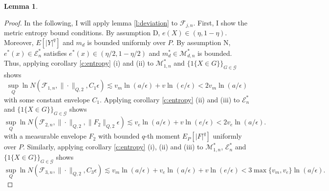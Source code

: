 \documentclass[12pt,oneside,reqno,english]{amsart}
\theoremstyle{definition}
\newtheorem{lemma}{Lemma}
\begin{document}
\begin{lemma}
\begin{proof}
In the following, I will apply lemma \ref{l:deviation} to $\mathcal{F}_{j,n}$. 
First, I show the metric entropy bound conditions. 
By assumption D, $e(X)\in (\eta,1-\eta)$. Moreover, $E[|Y|^{q}]$ and $m_{d}$ is bounded uniformly over $P$. 
By assumption N,  $e^{*}(x)\in \mathcal{E}^{*}_{n}$ satisfies $e^{*}(x)\in (\eta/2,1-\eta/2)$ and $m^{*}_{d}\in \mathcal{M}^{*}_{d,n}$ is bounded.
Thus, applying corollary \ref{c:entropy} (i) and (ii) to $\mathcal{M}^{*}_{1,n}$ and $\{1\{X\in G\}\}_{G\in \mathcal{G}}$ shows 
\[\sup_{Q}\ln N(\mathcal{F}_{1,n},\|\cdot\|_{Q,2},C_{1}\epsilon)\lesssim  v_{m}\ln(a/\epsilon)+v\ln(e/\epsilon)< 2v_{m}\ln(a/\epsilon)\]
with some constant envelope $C_{1}$. Applying corollary \ref{c:entropy} (ii) and (iii) to $\mathcal{E}^{*}_{n}$ and $\{1\{X\in G\}\}_{G\in \mathcal{G}}$ shows 
\[\sup_{Q}\ln N(\mathcal{F}_{2,n},\|\cdot \|_{Q,2},\|F_{2}\|_{Q,2}\epsilon)\lesssim v_{e}\ln(a/\epsilon)+v\ln(e/\epsilon)< 2v_{e}\ln(a/\epsilon).\]
with a measurable envelope $F_{2}$ with bounded $q$-th moment $E_{P}[|F|^{q}]$ uniformly over $P$. Similarly, applying corollary \ref{c:entropy} (i), (ii) and (iii) 
to $\mathcal{M}^{*}_{1,n}$, $\mathcal{E}^{*}_{n}$ and $\{1\{X\in G\}\}_{G\in \mathcal{G}}$ shows
\[\sup_{Q}\ln N(\mathcal{F}_{3,n},\|\cdot\|_{Q,2},C_{3}\epsilon )\lesssim v_{m}\ln(a/\epsilon)+v_{e}\ln(a/\epsilon)+v\ln(e/\epsilon)< 3\max\{v_{m},v_{e}\}\ln(a/\epsilon).\]


\end{proof}
\end{lemma}
\end{document}
